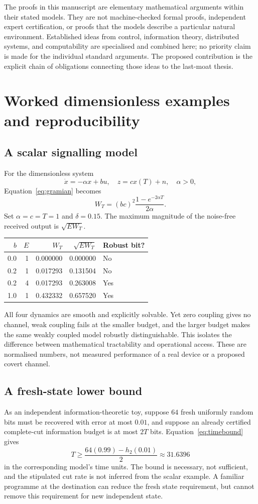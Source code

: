 \documentclass[11pt,a4paper]{article}
\theoremstyle{definition}
\theoremstyle{remark}
\begin{document}
The proofs in this manuscript are elementary mathematical arguments within their stated models. They are not machine-checked formal proofs, independent expert certification, or proofs that the models describe a particular natural environment. Established ideas from control, information theory, distributed systems, and computability are specialised and combined here; no priority claim is made for the individual standard arguments. The proposed contribution is the explicit chain of obligations connecting those ideas to the last-moat thesis.

\section{Worked dimensionless examples and reproducibility}\label{app:examples}
\subsection{A scalar signalling model}
For the dimensionless system
\[
 \dot x=-\alpha x+bu,\quad z=cx(T)+n,\quad \alpha>0,
\]
Equation~\eqref{eq:gramian} becomes
\begin{equation}\label{eq:scalar}
 W_T=(bc)^2\frac{1-e^{-2\alpha T}}{2\alpha}.
\end{equation}
Set $\alpha=c=T=1$ and $\delta=0.15$. The maximum magnitude of the noise-free received output is $\sqrt{EW_T}$.
\begin{center}
\begin{tabular}{@{}rrrrl@{}}
\toprule
$b$ & $E$ & $W_T$ & $\sqrt{EW_T}$ & Robust bit?\\
\midrule
0.0 & 1 & 0.000000 & 0.000000 & No\\
0.2 & 1 & 0.017293 & 0.131504 & No\\
0.2 & 4 & 0.017293 & 0.263008 & Yes\\
1.0 & 1 & 0.432332 & 0.657520 & Yes\\
\bottomrule
\end{tabular}
\end{center}
All four dynamics are smooth and explicitly solvable. Yet zero coupling gives no channel, weak coupling fails at the smaller budget, and the larger budget makes the same weakly coupled model robustly distinguishable. This isolates the difference between mathematical tractability and operational access. These are normalised numbers, not measured performance of a real device or a proposed covert channel.

\subsection{A fresh-state lower bound}
As an independent information-theoretic toy, suppose $64$ fresh uniformly random bits must be recovered with error at most $0.01$, and suppose an already certified complete-cut information budget is at most $2T$ bits. Equation~\eqref{eq:timebound} gives
\[
 T\geq\frac{64(0.99)-h_2(0.01)}{2}\approx31.6396
\]
in the corresponding model's time units. The bound is necessary, not sufficient, and the stipulated cut rate is not inferred from the scalar example. A familiar programme at the destination can reduce the fresh state requirement, but cannot remove this requirement for new independent state.
\end{document}
